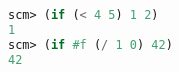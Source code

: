 \begin{lstlisting}[language=Scheme]
scm> (if (< 4 5) 1 2)
1
scm> (if #f (/ 1 0) 42)
42
\end{lstlisting}